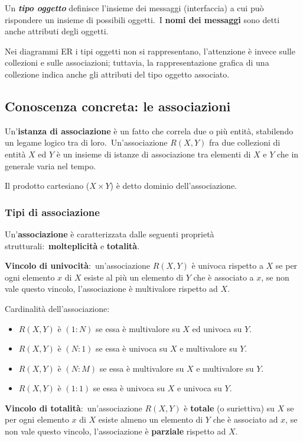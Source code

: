 Un \textbf{\textit{tipo oggetto}} definisce l'insieme dei messaggi (interfaccia) a cui può rispondere un insieme di possibili oggetti.\
I \textbf{nomi dei messaggi} sono detti anche attributi degli oggetti.

Nei diagrammi ER i tipi oggetti non si rappresentano, l'attenzione è invece sulle collezioni e sulle associazioni; tuttavia, la rappresentazione grafica di una collezione indica anche gli attributi del tipo oggetto associato.

\subsection{Conoscenza concreta: le associazioni}

Un'\textbf{istanza di associazione} è un fatto che correla due o più entità, stabilendo un legame logico tra di loro.\
Un'associazione $R(X, Y)$ fra due collezioni di entità $X$ ed $Y$ è un insieme di istanze di associazione tra elementi di $X$ e $Y$ che in generale varia nel tempo.

Il prodotto cartesiano ($X \times Y$) è detto dominio dell'associazione.

\subsubsection{Tipi di associazione}

Un'\textbf{associazione} è caratterizzata dalle seguenti proprietà strutturali:\ \textbf{molteplicità} e \textbf{totalità}.

\textbf{Vincolo di univocità}:\ un'associazione $R(X, Y)$ è univoca rispetto a $X$ se per ogni elemento $x$ di $X$ esiste al più un elemento di $Y$ che è associato a $x$, se non vale questo vincolo, l'associazione è multivalore rispetto ad $X$.

\noindent Cardinalità dell'associazione:
\begin{itemize}
	\item $R(X,Y)$ è $(1:N)$ se essa è multivalore su $X$ ed univoca su $Y$.
	\item $R(X,Y)$ è $(N:1)$ se essa è univoca su $X$ e multivalore su $Y$.
	\item $R(X,Y)$ è $(N:M)$ se essa è multivalore su $X$ e multivalore su $Y$.
	\item $R(X,Y)$ è $(1:1)$ se essa è univoca su $X$ e univoca su $Y$.
\end{itemize}
\textbf{Vincolo di totalità}:\ un'associazione $R(X, Y)$ è \textbf{totale} (o suriettiva) su $X$ se per ogni elemento $x$ di $X$ esiste almeno un elemento di $Y$ che è associato ad $x$,  se non vale questo vincolo, l'associazione è \textbf{parziale} rispetto ad $X$.

